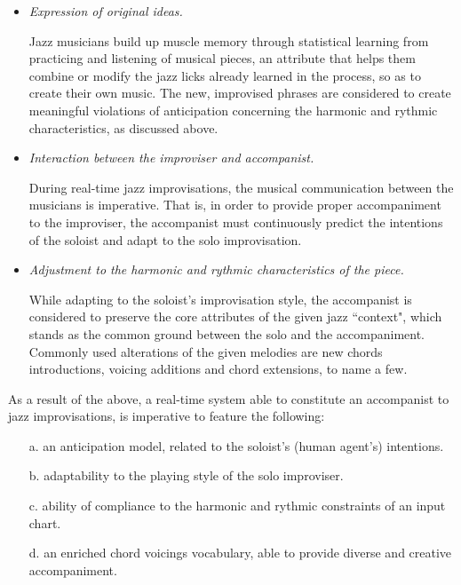     \begin{itemize}
        \item \textit{Expression of original ideas.} 
        
        Jazz musicians build up muscle memory through statistical learning from practicing and listening of musical pieces, an attribute that helps them combine or modify the jazz licks already learned in the process, so as to create their own music. The new, improvised phrases are considered to create meaningful violations of anticipation concerning the harmonic and rythmic characteristics, as discussed above.
        
        \item \textit{Interaction between the improviser and accompanist.} 

        During real-time jazz improvisations, the musical communication between the musicians is imperative. That is, in order to provide proper accompaniment to the improviser, the accompanist must continuously predict the intentions of the soloist and adapt to the solo improvisation.

        \item \textit{Adjustment to the harmonic and rythmic characteristics of the piece.} 

        While adapting to the soloist's improvisation style, the accompanist is considered to preserve the core attributes of the given jazz ``context", which stands as the common ground between the solo and the accompaniment. Commonly used alterations of the given melodies are new chords introductions, voicing additions and chord extensions, to name a few.
        
        
    \end{itemize}
    
    As a result of the above, a real-time system able to constitute an accompanist to jazz improvisations, is imperative to feature the following:
    
    \begin{itemize}
        \item[a.]   an anticipation model, related to the soloist's (human agent's) intentions.
        \item[b.]   adaptability to the playing style of the solo improviser.
        \item[c.]   ability of compliance to the harmonic and rythmic constraints of an input chart.
        \item[d.]   an enriched chord voicings vocabulary, able to provide diverse and creative accompaniment.
    \end{itemize}


